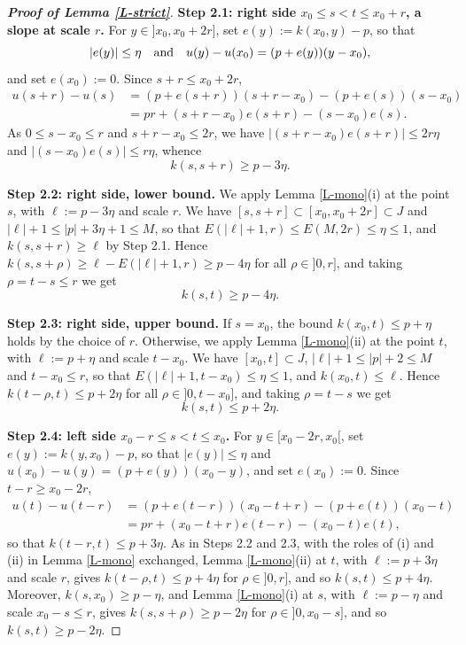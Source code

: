 \documentclass[reqno,12pt]{amsart}
\numberwithin{equation}{section}
\theoremstyle{remark}
\begin{document}
\begin{proof}[\bf Proof of Lemma \ref{L-strict}]
\medskip

{\bf Step 2.1: right side \boldmath$x_0\leq s<t\leq x_0+r$\unboldmath, a slope at scale \boldmath$r$\unboldmath.} For $y\in]x_0,x_0+2r]$, set $e(y):=k(x_0,y)-p$, so that
\begin{equation*}
|e(y)|\leq\eta\quad\hbox{and}\quad u(y)-u(x_0)=(p+e(y))(y-x_0),
\end{equation*}
and set $e(x_0):=0$. Since $s+r\leq x_0+2r$,
\begin{align*}
u(s+r)-u(s)&=(p+e(s+r))(s+r-x_0)-(p+e(s))(s-x_0)\\
&=pr+(s+r-x_0)e(s+r)-(s-x_0)e(s).
\end{align*}
As $0\leq s-x_0\leq r$ and $s+r-x_0\leq2r$, we have $|(s+r-x_0)e(s+r)|\leq2r\eta$ and $|(s-x_0)e(s)|\leq r\eta$, whence
\begin{equation*}
k(s,s+r)\geq p-3\eta.
\end{equation*}

\medskip

{\bf Step 2.2: right side, lower bound.} We apply Lemma \ref{L-mono}(i) at the point $s$, with $\ell:=p-3\eta$ and scale $r$. We have $[s,s+r]\subset[x_0,x_0+2r]\subset J$ and $|\ell|+1\leq|p|+3\eta+1\leq M$, so that $E(|\ell|+1,r)\leq E(M,2r)\leq\eta\leq1$, and $k(s,s+r)\geq\ell$ by Step 2.1. Hence $k(s,s+\rho)\geq\ell-E(|\ell|+1,r)\geq p-4\eta$ for all $\rho\in]0,r]$, and taking $\rho=t-s\leq r$ we get
\begin{equation*}
k(s,t)\geq p-4\eta.
\end{equation*}

\medskip

{\bf Step 2.3: right side, upper bound.} If $s=x_0$, the bound $k(x_0,t)\leq p+\eta$ holds by the choice of $r$. Otherwise, we apply Lemma \ref{L-mono}(ii) at the point $t$, with $\ell:=p+\eta$ and scale $t-x_0$. We have $[x_0,t]\subset J$, $|\ell|+1\leq|p|+2\leq M$ and $t-x_0\leq r$, so that $E(|\ell|+1,t-x_0)\leq\eta\leq1$, and $k(x_0,t)\leq\ell$. Hence $k(t-\rho,t)\leq p+2\eta$ for all $\rho\in]0,t-x_0]$, and taking $\rho=t-s$ we get
\begin{equation*}
k(s,t)\leq p+2\eta.
\end{equation*}

\medskip

{\bf Step 2.4: left side \boldmath$x_0-r\leq s<t\leq x_0$\unboldmath.} For $y\in[x_0-2r,x_0[$, set $e(y):=k(y,x_0)-p$, so that $|e(y)|\leq\eta$ and $u(x_0)-u(y)=(p+e(y))(x_0-y)$, and set $e(x_0):=0$. Since $t-r\geq x_0-2r$,
\begin{align*}
u(t)-u(t-r)&=(p+e(t-r))(x_0-t+r)-(p+e(t))(x_0-t)\\
&=pr+(x_0-t+r)e(t-r)-(x_0-t)e(t),
\end{align*}
so that $k(t-r,t)\leq p+3\eta$. As in Steps 2.2 and 2.3, with the roles of (i) and (ii) in Lemma \ref{L-mono} exchanged, Lemma \ref{L-mono}(ii) at $t$, with $\ell:=p+3\eta$ and scale $r$, gives $k(t-\rho,t)\leq p+4\eta$ for $\rho\in]0,r]$, and so $k(s,t)\leq p+4\eta$. Moreover, $k(s,x_0)\geq p-\eta$, and Lemma \ref{L-mono}(i) at $s$, with $\ell:=p-\eta$ and scale $x_0-s\leq r$, gives $k(s,s+\rho)\geq p-2\eta$ for $\rho\in]0,x_0-s]$, and so $k(s,t)\geq p-2\eta$.


\end{proof}
\end{document}

